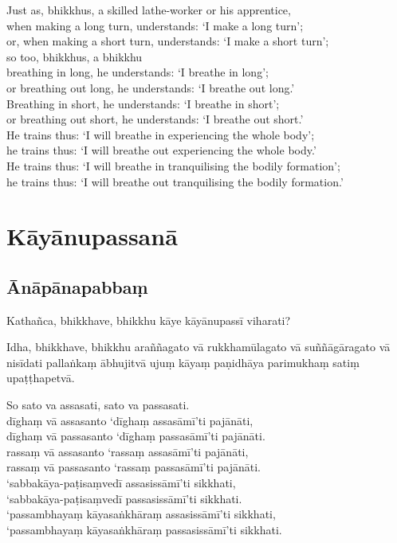 Just as, bhikkhus, a skilled lathe-worker or his apprentice,\\
when making a long turn, understands: ‘I make a long turn’;\\
or, when making a short turn, understands: ‘I make a short turn’;\\
so too, bhikkhus, a bhikkhu\\
breathing in long, he understands: ‘I breathe in long’;\\
or breathing out long, he understands: ‘I breathe out long.’\\
Breathing in short, he understands: ‘I breathe in short’;\\
or breathing out short, he understands: ‘I breathe out short.’\\
He trains thus: ‘I will breathe in experiencing the whole body’;\\
he trains thus: ‘I will breathe out experiencing the whole body.’\\
He trains thus: ‘I will breathe in tranquilising the bodily formation’;\\
he trains thus: ‘I will breathe out tranquilising the bodily formation.’

\paliPage
\chapter*{Kāyānupassanā}

\section*{Ānāpānapabbaṃ}

Kathañca, bhikkhave, bhikkhu kāye kāyānupassī viharati?

Idha, bhikkhave, bhikkhu araññagato vā rukkhamūlagato vā suññāgāragato vā nisīdati
pallaṅkaṃ ābhujitvā ujuṃ kāyaṃ paṇidhāya parimukhaṃ satiṃ upaṭṭhapetvā.

So sato va assasati, sato va passasati.\\
dīghaṃ vā assasanto ‘dīghaṃ assasāmī’ti pajānāti,\\
dīghaṃ vā passasanto ‘dīghaṃ passasāmī’ti pajānāti.\\
rassaṃ vā assasanto ‘rassaṃ assasāmī’ti pajānāti,\\
rassaṃ vā passasanto ‘rassaṃ passasāmī’ti pajānāti.\\
‘sabbakāya-paṭisaṃvedī assasissāmī’ti sikkhati,\\
‘sabbakāya-paṭisaṃvedī passasissāmī’ti sikkhati.\\
‘passambhayaṃ kāyasaṅkhāraṃ assasissāmī’ti sikkhati,\\
‘passambhayaṃ kāyasaṅkhāraṃ passasissāmī’ti sikkhati.

